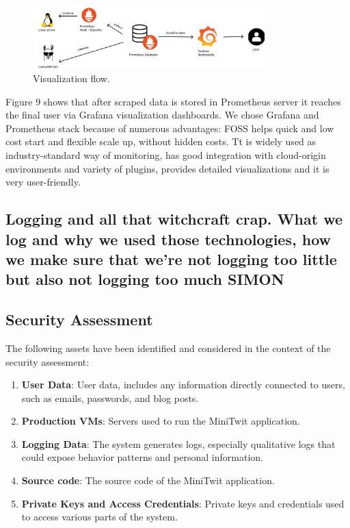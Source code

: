 \documentclass{article}
\begin{document}
\begin{figure}[ht]
    \centering
    \includegraphics[width=0.8\textwidth]{./pdfs/visualization_flow.pdf} 
    \caption{Visualization flow.}
    \label{fig:visualization flow}
\end{figure}

Figure 9 shows that after scraped data is stored in Prometheus server it reaches the final user via Grafana visualization dashboards. We chose Grafana and Prometheus stack because of numerous advantages: FOSS helps quick and low cost start and flexible scale up, without hidden costs. Tt is widely used as industry-standard way of monitoring, has good integration with cloud-origin environments and variety of plugins, provides detailed visualizations and it is very user-friendly. 


\subsection{Logging and all that witchcraft crap. What we log and why we used those technologies, how we make sure that we're not logging too little but also not logging too much SIMON}

\subsection{Security Assessment}
The following assets have been identified and considered in the context of the security assessment:

\begin{enumerate}
\item \textbf{User Data}: User data, includes any information directly connected to users, such as emails, passwords, and blog posts.
\item \textbf{Production VMs}: Servers used to run the MiniTwit application.
\item \textbf{Logging Data}: The system generates logs, especially qualitative logs that could expose behavior patterns and personal information.
\item \textbf{Source code}: The source code of the MiniTwit application.
\item \textbf{Private Keys and Access Credentials}: Private keys and credentials used to access various parts of the system.
\end{enumerate}
\end{document}
